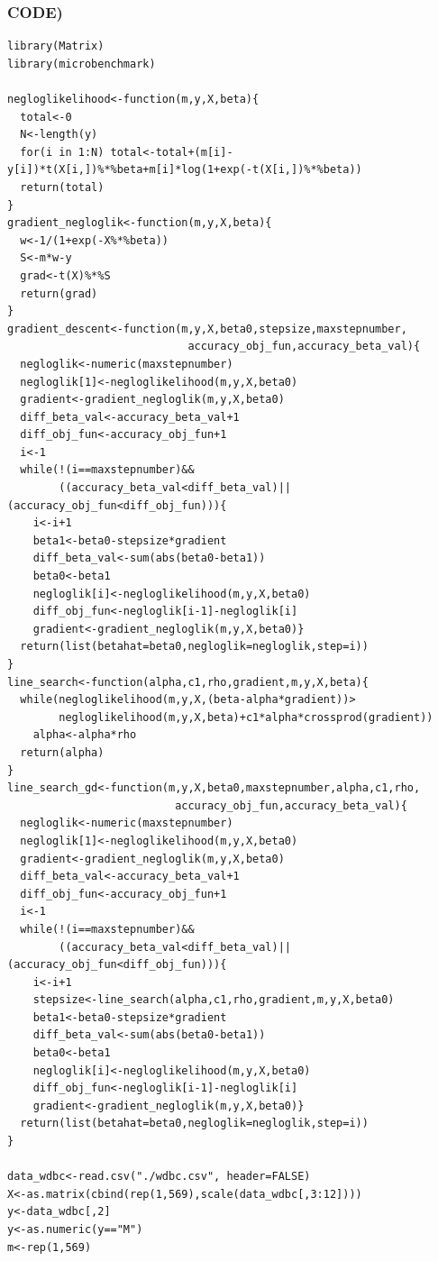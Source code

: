 \documentclass{article}
\begin{document}
\newpage

\subsubsection*{CODE)}

\begin{lstlisting}[basicstyle=\small]
library(Matrix)
library(microbenchmark)

negloglikelihood<-function(m,y,X,beta){
  total<-0
  N<-length(y)
  for(i in 1:N) total<-total+(m[i]-y[i])*t(X[i,])%*%beta+m[i]*log(1+exp(-t(X[i,])%*%beta))
  return(total)
}
gradient_negloglik<-function(m,y,X,beta){
  w<-1/(1+exp(-X%*%beta))
  S<-m*w-y
  grad<-t(X)%*%S
  return(grad)
}
gradient_descent<-function(m,y,X,beta0,stepsize,maxstepnumber,
							accuracy_obj_fun,accuracy_beta_val){
  negloglik<-numeric(maxstepnumber)
  negloglik[1]<-negloglikelihood(m,y,X,beta0)
  gradient<-gradient_negloglik(m,y,X,beta0)
  diff_beta_val<-accuracy_beta_val+1
  diff_obj_fun<-accuracy_obj_fun+1
  i<-1
  while(!(i==maxstepnumber)&&
  	    ((accuracy_beta_val<diff_beta_val)||(accuracy_obj_fun<diff_obj_fun))){
    i<-i+1
    beta1<-beta0-stepsize*gradient
    diff_beta_val<-sum(abs(beta0-beta1))
    beta0<-beta1
    negloglik[i]<-negloglikelihood(m,y,X,beta0)
    diff_obj_fun<-negloglik[i-1]-negloglik[i]
    gradient<-gradient_negloglik(m,y,X,beta0)}
  return(list(betahat=beta0,negloglik=negloglik,step=i))
}
line_search<-function(alpha,c1,rho,gradient,m,y,X,beta){
  while(negloglikelihood(m,y,X,(beta-alpha*gradient))>
        negloglikelihood(m,y,X,beta)+c1*alpha*crossprod(gradient))
    alpha<-alpha*rho
  return(alpha)
}
line_search_gd<-function(m,y,X,beta0,maxstepnumber,alpha,c1,rho,
						  accuracy_obj_fun,accuracy_beta_val){
  negloglik<-numeric(maxstepnumber)
  negloglik[1]<-negloglikelihood(m,y,X,beta0)
  gradient<-gradient_negloglik(m,y,X,beta0)
  diff_beta_val<-accuracy_beta_val+1
  diff_obj_fun<-accuracy_obj_fun+1
  i<-1
  while(!(i==maxstepnumber)&&
  	    ((accuracy_beta_val<diff_beta_val)||(accuracy_obj_fun<diff_obj_fun))){
    i<-i+1
    stepsize<-line_search(alpha,c1,rho,gradient,m,y,X,beta0)
    beta1<-beta0-stepsize*gradient
    diff_beta_val<-sum(abs(beta0-beta1))
    beta0<-beta1
    negloglik[i]<-negloglikelihood(m,y,X,beta0)
    diff_obj_fun<-negloglik[i-1]-negloglik[i]
    gradient<-gradient_negloglik(m,y,X,beta0)}
  return(list(betahat=beta0,negloglik=negloglik,step=i))
}

data_wdbc<-read.csv("./wdbc.csv", header=FALSE)
X<-as.matrix(cbind(rep(1,569),scale(data_wdbc[,3:12])))
y<-data_wdbc[,2]
y<-as.numeric(y=="M")
m<-rep(1,569)


\end{lstlisting}
\end{document}
